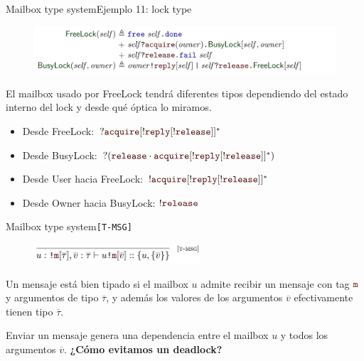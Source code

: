 \documentclass{beamer}
\newcommand{\msgtag}[1]{\texttt{\textcolor{msg-color}{#1}}}
\begin{document}
\begin{frame}{Mailbox type system}{Ejemplo 11: lock type}
    \begin{figure}[H]
        \centering
        \includegraphics[width=\textwidth]{example1-lock}
    \end{figure}

    El mailbox usado por FreeLock tendrá diferentes tipos dependiendo del estado interno del lock y desde qué óptica lo miramos.
    \vspace{1em}

    \begin{itemize}
        \item Desde FreeLock: $?\msgtag{acquire}[!\msgtag{reply}[!\msgtag{release}]]^\ast$
        \item Desde BusyLock: $?(\msgtag{release} \cdot \msgtag{acquire}[!\msgtag{reply}[!\msgtag{release}]]^\ast)$
        \item Desde User hacia FreeLock: $!\msgtag{acquire}[!\msgtag{reply}[!\msgtag{release}]]^\ast$
        \item Desde Owner hacia BusyLock: $!\msgtag{release}$

    \end{itemize}
\end{frame}

\begin{frame}{Mailbox type system}{\texttt{[T-MSG]}}
    \begin{figure}[H]
        \includegraphics[height=2em]{typing-rules-t-msg}
    \end{figure}

    Un mensaje está bien tipado si el mailbox $u$ admite recibir un mensaje con tag $\msgtag{m}$ y argumentos de tipo $\overline{\tau}$, y además los valores de los argumentos $\overline{v}$ efectivamente tienen tipo $\overline{\tau}$.
    \vspace{1em}

    Enviar un mensaje genera una dependencia entre el mailbox $u$ y todos los argumentos $\overline{v}$. \textbf{¿Cómo evitamos un deadlock?}
\end{frame}
\end{document}
